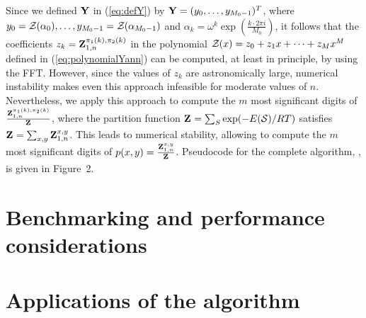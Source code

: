 Since we defined $\bf Y$ in (\ref{eq:defY}) by ${\bf Y} =
(y_0,\dots,y_{M_0-1})^T$, where
$y_0={\mathcal Z}_{}(\alpha_0),\dots, y_{M_0-1}={\mathcal Z}_{}(\alpha_{M_0-1})$ and $\alpha_k = \omega^k
\exp(\frac{k \cdot 2\pi i}{M_0})$,
it follows that the coefficients
$z_k={\bf Z}^{\pi_1(k),\pi_2(k)}_{1,n}$ in the polynomial
${\mathcal Z}_{}(x) = z_0 + z_1 x + \dots + z_{M} x^{M}$ defined in
(\ref{eq:polynomialYann}) can be computed, at least in principle,
by using the FFT. However, since the values of
$z_{k}$ are astronomically large, numerical
instability makes even this approach infeasible for moderate values of $n$.
Nevertheless, we apply this approach to compute the $m$ most significant
digits of $\frac{{\bf Z}^{\pi_1(k),\pi_2(k)}_{1,n}}{{\bf Z}^{}_{}}$,
where the partition function ${\bf Z}^{}_{} = \sum_{S} \exp(-E(\mathcal S)/RT)$ satisfies
${{\bf Z}^{}_{}} = \sum_{x,y} {\bf Z}^{x,y}_{1,n}$. This leads to numerical stability,
allowing \ffttwo to compute the
$m$ most significant digits of $p(x,y) = \frac{{\bf Z}^{x,y}_{1,n}}{{\bf Z}^{}_{}}$.
Pseudocode for the complete algorithm, \fftbor, is given in
Figure~2.

\section{Benchmarking and performance considerations}
\label{sec:ffttwo:benchmarking}

\section{Applications of the \ffttwo algorithm}
\label{sec:ffttwo:applications}
